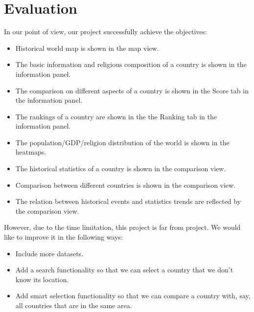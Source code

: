 \documentclass[12pt, fullpage,letterpaper]{article}
\begin{document}
\section{Evaluation}
In our point of view, our project successfully achieve the objectives:
\begin{itemize}
    \item Historical world map is shown in the map view.

    \item The basic information and religious composition of a country is shown in the information panel.

    \item The comparison on different aspects of a country is shown in the Score tab in the information panel.

    \item The rankings of a country are shown in the the Ranking tab in the information panel.

    \item The population/GDP/religion distribution of the world is shown in the heatmaps.

    \item The historical statistics of a country is shown in the comparison view.

    \item Comparison between different countries is shown in the comparison view.

    \item The relation between historical events and statistics trends are reflected by the comparison view.
\end{itemize}

However, due to the time limitation, this project is far from project. We would like to improve it in the following ways:
\begin{itemize}
    \item Include more datasets.
    \item Add a search functionality so that we can select a country that we don't know its location.
    \item Add smart selection functionality so that we can compare a country with, say, all countries that are in the same area.
\end{itemize}
\end{document}
